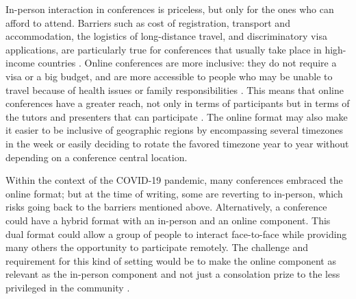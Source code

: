 \documentclass[10pt,letterpaper]{article}
\begin{document}
In-person interaction in conferences is priceless, but only for the ones who can afford to attend. 
Barriers such as cost of registration, transport and accommodation, the logistics of long-distance travel, and discriminatory visa applications, are particularly true for conferences that usually take place in high-income countries \cite{arendDisparityConferenceRegistration2019,gewinWhatScientistsShould2019,jooKeepOnlineOption2021}. 
Online conferences are more inclusive: they do not require a visa or a big budget, and are more accessible to people who may be unable to travel because of health issues or family responsibilities \cite{salibaGettingGripsOnline2020}.
This means that online conferences have a greater reach, not only in terms of participants but in terms of the tutors and presenters that can participate \cite{atkinsonJournalMedicine20202021, roosOnlineConferencesNew2020, jooKeepOnlineOption2021}.
The online format may also make it easier to be inclusive of geographic regions by encompassing several timezones in the week or easily deciding to rotate the favored timezone year to year without depending on a conference central location. 

Within the context of the COVID-19 pandemic, many conferences embraced the online format; but at the time of writing, some are reverting to in-person, which risks going back to the barriers mentioned above.
Alternatively, a conference could have a hybrid format with an in-person and an online component. This dual format could allow a group of people to interact face-to-face while providing many others the opportunity to participate remotely. 
The challenge and requirement for this kind of setting would be to make the online component as relevant as the in-person component and not just a consolation prize to the less privileged in the community \cite{ninerBetterWhomLeveling2021}.
\end{document}
